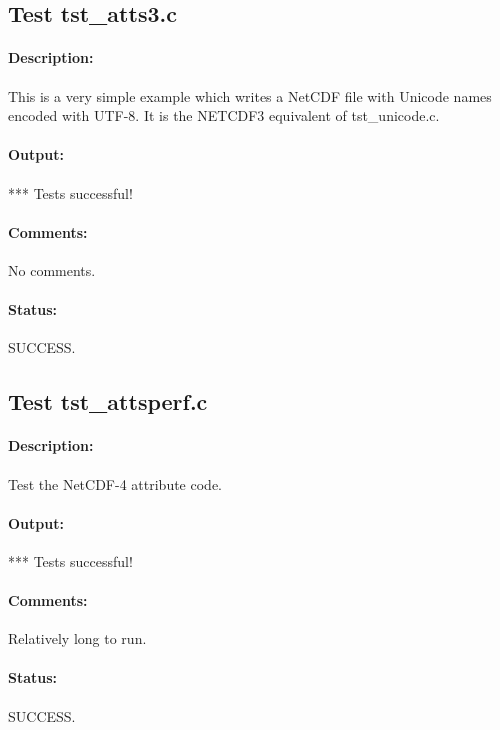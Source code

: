 \subsection{Test tst\_atts3.c}

\paragraph{Description:} This is a very simple example which writes a NetCDF file with Unicode names encoded with UTF-8. It is the NETCDF3 equivalent of tst\_unicode.c.

\paragraph{Output:} *** Tests successful!

\paragraph{Comments:} No comments.

\paragraph{Status:} SUCCESS.

\subsection{Test tst\_attsperf.c}

\paragraph{Description:} Test the NetCDF-4 attribute code.

\paragraph{Output:} *** Tests successful!

\paragraph{Comments:} Relatively long to run.

\paragraph{Status:} SUCCESS.



